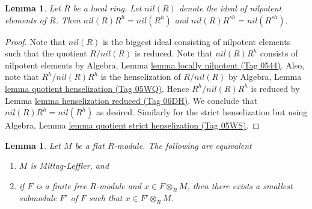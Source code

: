 \documentclass{amsart}
\theoremstyle{plain}
\newtheorem{lemma}[subsection]{Lemma}
\theoremstyle{definition}
\theoremstyle{remark}
\numberwithin{equation}{subsection}
\begin{document}
\begin{lemma}
\label{more-algebra-lemma-henselization-nil}
Let $R$ be a local ring. Let $nil(R)$ denote the ideal of
nilpotent elements of $R$. Then $nil(R)R^h = nil(R^h)$ and
$nil(R)R^{sh} = nil(R^{sh})$.
\end{lemma}

\begin{proof}
Note that $nil(R)$ is the biggest ideal consisting of nilpotent elements
such that the quotient $R/nil(R)$ is reduced. Note that $nil(R)R^h$
consists of nilpotent elements by
Algebra, Lemma \href{https://stacks.math.columbia.edu/tag/0544}{lemma locally nilpotent (Tag 0544)}.
Also, note that $R^h/nil(R) R^h$ is the
henselization of $R/nil(R)$ by
Algebra, Lemma \href{https://stacks.math.columbia.edu/tag/05WQ}{lemma quotient henselization (Tag 05WQ)}.
Hence $R^h/nil(R)R^h$ is reduced by
Lemma \href{https://stacks.math.columbia.edu/tag/06DH}{lemma henselization reduced (Tag 06DH)}.
We conclude that $nil(R) R^h = nil(R^h)$ as desired.
Similarly for the strict henselization but using
Algebra, Lemma \href{https://stacks.math.columbia.edu/tag/05WS}{lemma quotient strict henselization (Tag 05WS)}.
\end{proof}


\begin{lemma}
\label{algebra-lemma-flat-ML-criterion}
Let $M$ be a flat $R$-module. The following are equivalent
\begin{enumerate}
\item $M$ is Mittag-Leffler, and
\item if $F$ is a finite free $R$-module and
$x \in F \otimes_R M$, then there exists a smallest submodule $F'$ of $F$
such that $x \in F' \otimes_R M$.
\end{enumerate}
\end{lemma}
\end{document}
